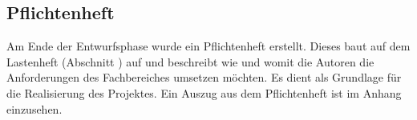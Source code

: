 \subsection{Pflichtenheft}
\label{sec:Pflichtenheft}
Am Ende der Entwurfsphase wurde ein Pflichtenheft erstellt. Dieses baut auf dem Lastenheft (Abschnitt ) auf und beschreibt wie und womit die Autoren die
Anforderungen des Fachbereiches umsetzen möchten. Es dient als Grundlage für die Realisierung des Projektes. Ein Auszug aus dem Pflichtenheft ist im Anhang 
einzusehen.